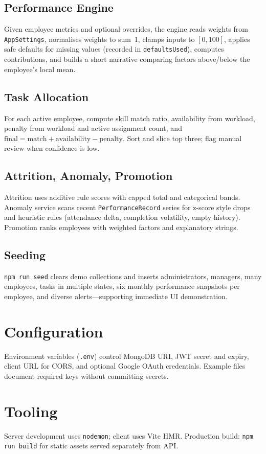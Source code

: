 \subsection{Performance Engine}
Given employee metrics and optional overrides, the engine reads weights from \texttt{AppSettings}, normalises weights to sum~1, clamps inputs to $[0,100]$, applies safe defaults for missing values (recorded in \texttt{defaultsUsed}), computes contributions, and builds a short narrative comparing factors above/below the employee's local mean.

\subsection{Task Allocation}
For each active employee, compute skill match ratio, availability from workload, penalty from workload and active assignment count, and $\text{final} = \text{match} + \text{availability} - \text{penalty}$. Sort and slice top three; flag manual review when confidence is low.

\subsection{Attrition, Anomaly, Promotion}
Attrition uses additive rule scores with capped total and categorical bands. Anomaly service scans recent \texttt{PerformanceRecord} series for z-score style drops and heuristic rules (attendance delta, completion volatility, empty history). Promotion ranks employees with weighted factors and explanatory strings.

\subsection{Seeding}
\texttt{npm run seed} clears demo collections and inserts administrators, managers, many employees, tasks in multiple states, six monthly performance snapshots per employee, and diverse alerts---supporting immediate UI demonstration.

\section{Configuration}
Environment variables (\texttt{.env}) control MongoDB URI, JWT secret and expiry, client URL for CORS, and optional Google OAuth credentials. Example files document required keys without committing secrets.

\section{Tooling}
Server development uses \texttt{nodemon}; client uses Vite HMR. Production build: \texttt{npm run build} for static assets served separately from API.
